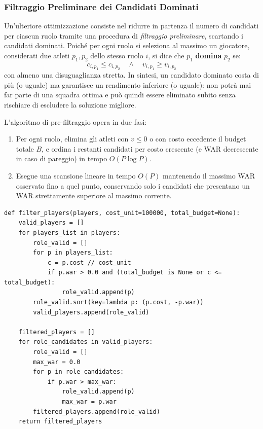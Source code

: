 \subsubsection{Filtraggio Preliminare dei Candidati Dominati}
Un'ulteriore ottimizzazione consiste nel ridurre in partenza il numero di candidati per ciascun ruolo tramite una procedura di \textit{filtraggio preliminare}, scartando i candidati dominati.
Poiché per ogni ruolo si seleziona al massimo un giocatore, considerati due atleti $p_1, p_2$ dello stesso ruolo $i$, si dice che $p_1$ \textbf{domina} $p_2$ se:
\begin{equation}
	c_{i, p_1} \le c_{i, p_2} \quad \wedge \quad v_{i, p_1} \ge v_{i, p_2}
\end{equation}
con almeno una disuguaglianza stretta. In sintesi, un candidato dominato costa di più (o uguale) ma garantisce un rendimento inferiore (o uguale): non potrà mai far parte di una squadra ottima e può quindi essere eliminato subito senza rischiare di escludere la soluzione migliore.

L'algoritmo di pre-filtraggio opera in due fasi:
\begin{enumerate}
	\item Per ogni ruolo, elimina gli atleti con $v \le 0$ o con costo eccedente il budget totale $B$, e ordina i restanti candidati per costo crescente (e WAR decrescente in caso di pareggio) in tempo $O(P \log P)$.
	\item Esegue una scansione lineare in tempo $O(P)$ mantenendo il massimo WAR osservato fino a quel punto, conservando solo i candidati che presentano un WAR strettamente superiore al massimo corrente.
\end{enumerate}

\begin{lstlisting}
def filter_players(players, cost_unit=100000, total_budget=None):
    valid_players = []
    for players_list in players:
        role_valid = []
        for p in players_list:
            c = p.cost // cost_unit
            if p.war > 0.0 and (total_budget is None or c <= total_budget):
                role_valid.append(p)
        role_valid.sort(key=lambda p: (p.cost, -p.war))
        valid_players.append(role_valid)

    filtered_players = []
    for role_candidates in valid_players:
        role_valid = []
        max_war = 0.0
        for p in role_candidates:
            if p.war > max_war:
                role_valid.append(p)
                max_war = p.war
        filtered_players.append(role_valid)
    return filtered_players
\end{lstlisting}

